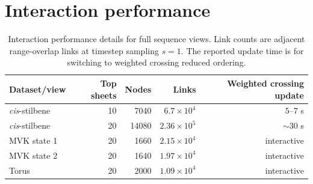 \documentclass[review]{vgtc}
\begin{document}

\section{Interaction performance}
\label{sec:supp-browser-scale}

\begin{table}[t]
\centering
\caption{
Interaction performance details for full sequence views. Link counts are adjacent range-overlap links at timestep sampling $s=1$. The reported update time is for switching to weighted crossing reduced ordering.
}
\label{tab:browser-interaction-scale}
\begin{tabular}{lrrrr}
\toprule
Dataset/view & Top sheets & Nodes & Links & Weighted crossing update \\
\midrule
\textit{cis}-stilbene & 10 & 7040 & $6.7{\times}10^4$ & $5$--$7$ s \\
\textit{cis}-stilbene & 20 & 14080 & $2.36{\times}10^5$ & $\sim30$ s \\
MVK state 1 & 20 & 1660 & $2.15{\times}10^4$ & interactive \\
MVK state 2 & 20 & 1640 & $1.97{\times}10^4$ & interactive \\
Torus & 20 & 2000 & $1.09{\times}10^4$ & interactive \\
\bottomrule
\end{tabular}
\end{table}
\end{document}
